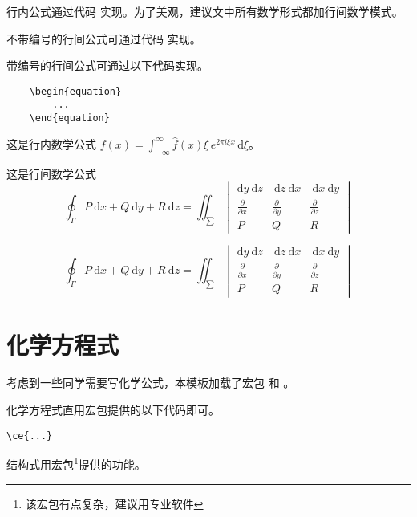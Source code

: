 \documentclass{imutthesis}
\begin{document}
行内公式通过代码 实现。为了美观，建议文中所有数学形式都加行间数学模式。

不带编号的行间公式可通过代码\myverb{\[  ...  \]}  实现。

带编号的行间公式可通过以下代码实现。
\begin{lstlisting}
	\begin{equation}
		...
	\end{equation}
\end{lstlisting} 

这是行内数学公式
$ 	f(x) = \int_{-\infty}^\infty  \hat f(x)\xi\,e^{2 \pi i \xi x}  \,\mathrm{d}\xi  $。

这是行间数学公式
\[ \oint_{\Gamma} P \mathrm{~d} x+Q \mathrm{~d} y+R \mathrm{~d} z=\iint_{\sum} 
\begin{vmatrix}
	\mathrm{d} y \mathrm{~d} z & \mathrm{~d} z \mathrm{~d} x & \mathrm{~d} x \mathrm{~d} y \\
	\frac{\partial}{\partial x} & \frac{\partial}{\partial y} & \frac{\partial}{\partial z} \\
	P & Q & R
\end{vmatrix} \]

\begin{equation}
	\oint_{\Gamma} P \mathrm{~d} x+Q \mathrm{~d} y+R \mathrm{~d} z=\iint_{\sum} 
	\begin{vmatrix}
		\mathrm{d} y \mathrm{~d} z & \mathrm{~d} z \mathrm{~d} x & \mathrm{~d} x \mathrm{~d} y \\
		\frac{\partial}{\partial x} & \frac{\partial}{\partial y} & \frac{\partial}{\partial z} \\
		P & Q & R
	\end{vmatrix}
\end{equation}


\section{化学方程式}
考虑到一些同学需要写化学公式，本模板加载了宏包   和 。 

化学方程式直用宏包提供的以下代码即可。
\begin{lstlisting}
\ce{...}
\end{lstlisting} 
\begin{center}
\end{center}
结构式用宏包\footnote{该宏包有点复杂，建议用专业软件}提供的功能。
\begin{center}
\end{center}
\end{document}
